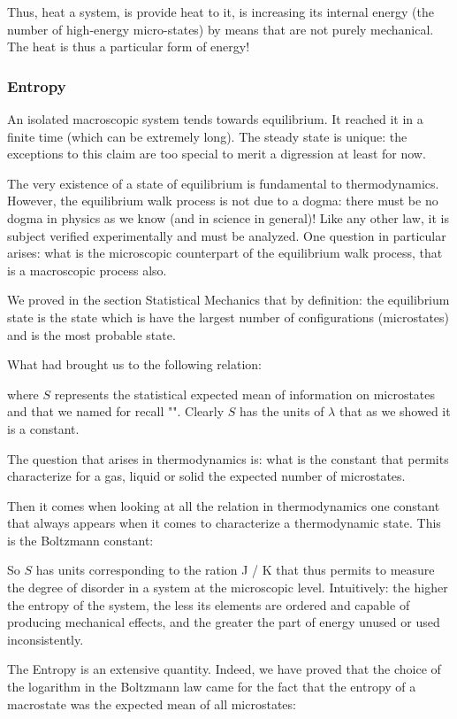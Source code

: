 	Thus, heat a system, is provide heat to it, is increasing its internal energy (the number of high-energy micro-states) by means that are not purely mechanical. The heat is thus a particular form of energy!
	
	\pagebreak
	\subsubsection{Entropy}
	An isolated macroscopic system tends towards equilibrium. It reached it in a finite time (which can be extremely long). The steady state is unique: the exceptions to this claim are too special to merit a digression at least for now.

	The very existence of a state of equilibrium is fundamental to thermodynamics. However, the equilibrium walk process is not due to a dogma: there must be no dogma in physics as we know (and in science in general)! Like any other law, it is subject verified experimentally and must be analyzed. One question in particular arises: what is the microscopic counterpart of the equilibrium walk process, that is a macroscopic process also.

	We proved in the section Statistical Mechanics that by definition: the equilibrium state is the state which is have the largest number of configurations (microstates) and is the most probable state.

	What had brought us to the following relation:
	
	where $S$ represents the statistical expected mean of information on microstates and that we named for recall "". Clearly $S$ has the units of $\lambda$ that as we showed it is a constant.

	The question that arises in thermodynamics is: what is the constant that permits characterize for a gas, liquid or solid the expected number of microstates.

	Then it comes when looking at all the relation in thermodynamics one constant that always appears when it comes to characterize a thermodynamic state. This is the Boltzmann constant:
	
	So $S$ has units corresponding to the ration J / K that thus permits to measure the degree of disorder in a system at the microscopic level. Intuitively: the higher the entropy of the system, the less its elements are ordered and capable of producing mechanical effects, and the greater the part of energy unused or used inconsistently.
	
	The Entropy is an extensive quantity. Indeed, we have proved that the choice of the logarithm in the Boltzmann law came for the fact that the entropy of a macrostate was the expected mean of all microstates:
	
